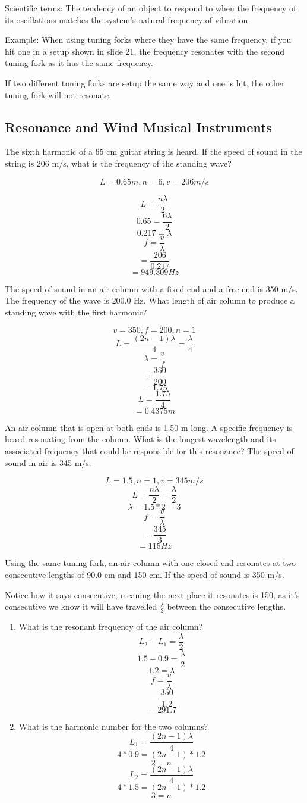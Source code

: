\documentclass[10pt]{article}
\begin{document}
Scientific terms: The tendency of an object to respond to when the frequency of its oscillations matches the system's natural frequency of vibration 

Example: When using tuning forks where they have the same frequency, if you hit one in a setup shown in slide 21, the frequency resonates with the second tuning fork as it has the same frequency. 

If two different tuning forks are setup the same way and one is hit, the other tuning fork will not resonate.

\subsection{Resonance and Wind Musical Instruments}

The sixth harmonic of a 65 cm guitar string is heard. If the speed of sound in the string is 206 m/s, what is the frequency of the standing wave?

$$L = 0.65m, n = 6, v=206m/s$$

$$L=\frac{n\lambda}{2}$$
$$0.65=\frac{6\lambda}{2}$$
$$0.217=\lambda$$
$$f=\frac{v}{\lambda}$$
$$=\frac{206}{0.217}$$
$$=949.309Hz$$

The speed of sound in an air column with a fixed end and a free end is 350 m/s. The frequency of the wave is 200.0 Hz. What length of air column to produce a standing wave with the first harmonic?

$$v=350,f=200,n=1$$
$$L=\frac{(2n-1)\lambda}{4}=\frac{\lambda}{4}$$
$$\lambda=\frac{v}{f}$$
$$=\frac{350}{200}$$
$$=1.75$$
$$L=\frac{1.75}{4}$$
$$=0.4375m$$

An air column that is open at both ends is 1.50 m long. A specific frequency is heard resonating from the column. What is the longest wavelength and its associated frequency that could be responsible for this resonance? The speed of sound in air is 345 m/s.

$$L=1.5,n=1,v=345m/s$$
$$L=\frac{n\lambda}{2}=\frac{\lambda}{2}$$
$$\lambda=1.5*2=3$$
$$f=\frac{v}{\lambda}$$
$$=\frac{345}{3}$$
$$=115Hz$$

Using the same tuning fork, an air column with one closed end resonates at two consecutive lengths of 90.0 cm and 150 cm. If the speed of sound is 350 m/s.

Notice how it says consecutive, meaning the next place it resonates is 150, as it's consecutive we know it will have travelled $\frac{\lambda}{2}$ between the consecutive lengths.
\begin{enumerate}
    \item What is the resonant frequency of the air column?
    $$L_2-L_1=\frac{\lambda}{2}$$
    $$1.5-0.9=\frac{\lambda}{2}$$
    $$1.2=\lambda$$
    $$f=\frac{v}{\lambda}$$
    $$=\frac{350}{1.2}$$
    $$=291.7$$
    \item What is the harmonic number for the two columns?
    $$L_1=\frac{(2n-1)\lambda}{4}$$
    $$4*0.9=(2n-1)*1.2$$
    $$2=n$$
    $$L_2=\frac{(2n-1)\lambda}{4}$$
    $$4*1.5=(2n-1)*1.2$$
    $$3=n$$
\end{enumerate}
\end{document}

